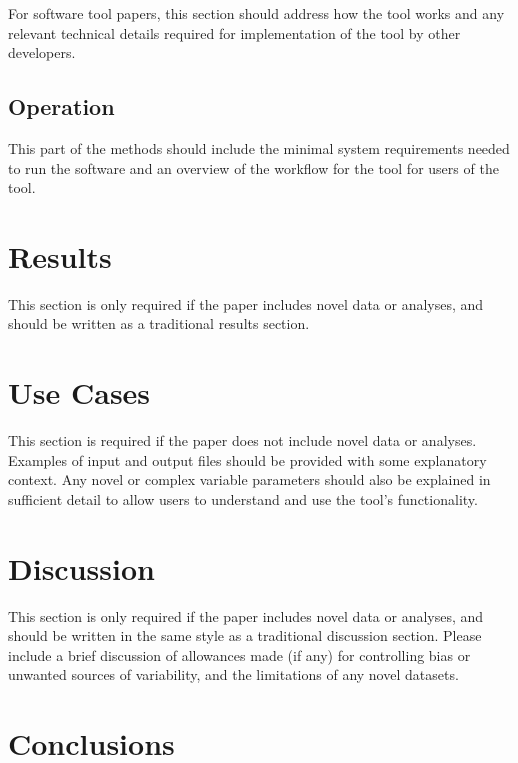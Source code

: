 \documentclass[9pt,a4paper,]{extarticle}
\begin{document}
For software tool papers, this section should address how the tool works and any relevant technical details required for implementation of the tool by other developers.

\hypertarget{operation}{%
\subsection{Operation}\label{operation}}

This part of the methods should include the minimal system requirements needed to run the software and an overview of the workflow for the tool for users of the tool.

\hypertarget{results}{%
\section{\texorpdfstring{Results }{Results }}\label{results}}

This section is only required if the paper includes novel data or analyses, and should be written as a traditional results section.

\hypertarget{use-cases}{%
\section{\texorpdfstring{Use Cases }{Use Cases }}\label{use-cases}}

This section is required if the paper does not include novel data or analyses.
Examples of input and output files should be provided with some explanatory context. Any novel or complex variable parameters should also be explained in sufficient detail to allow users to understand and use the tool's functionality.

\hypertarget{discussion}{%
\section{\texorpdfstring{Discussion }{Discussion }}\label{discussion}}

This section is only required if the paper includes novel data or analyses, and should be written in the same style as a traditional discussion section.
Please include a brief discussion of allowances made (if any) for controlling bias or unwanted sources of variability, and the limitations of any novel datasets.

\hypertarget{conclusions}{%
\section{\texorpdfstring{Conclusions }{Conclusions }}\label{conclusions}}
\end{document}
